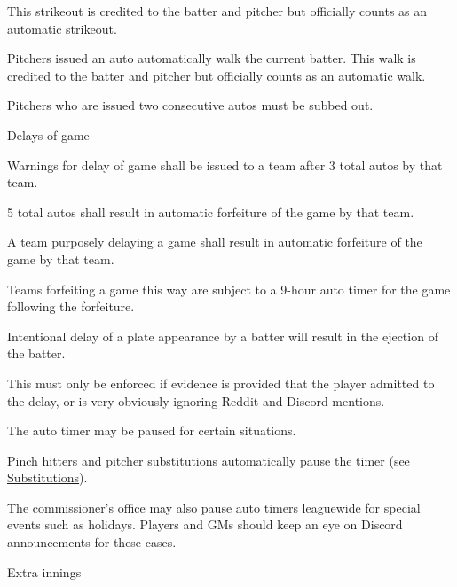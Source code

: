 \begin{deepEnumerate}
\begin{deepEnumerate}
\begin{deepEnumerate}
			This strikeout is credited to the batter and pitcher but officially counts as an automatic strikeout.
			\item Pitchers issued an auto automatically walk the current batter. 
			This walk is credited to the batter and pitcher but officially counts as an automatic walk.
		\end{deepEnumerate}
		\item Pitchers who are issued two consecutive autos must be subbed out.
		\item Delays of game
		\begin{deepEnumerate}
			\item Warnings for delay of game shall be issued to a team after 3 total autos by that team.
			\item 5 total autos shall result in automatic forfeiture of the game by that team.
			\item A team purposely delaying a game shall result in automatic forfeiture of the game by that team.
			\begin{deepEnumerate}
				\item Teams forfeiting a game this way are subject to a 9-hour auto timer for the game following the forfeiture.
			\end{deepEnumerate}
			\item Intentional delay of a plate appearance by a batter will result in the ejection of the batter.
			\begin{deepEnumerate}
				\item This must only be enforced if evidence is provided that the player admitted to the delay, 
				or is very obviously ignoring Reddit and Discord mentions.
			\end{deepEnumerate}
		\end{deepEnumerate}
		\item The auto timer may be paused for certain situations.
		\begin{deepEnumerate}
			\item Pinch hitters and pitcher substitutions automatically pause the timer (see \hyperref[sec:substitutions]{Substitutions}).
			\item The commissioner's office may also pause auto timers leaguewide for special events such as holidays. 
			Players and GMs should keep an eye on Discord announcements for these cases.
		\end{deepEnumerate}
	\end{deepEnumerate}
	\item Extra innings
	\label{sec:extra innings}

\end{deepEnumerate}
